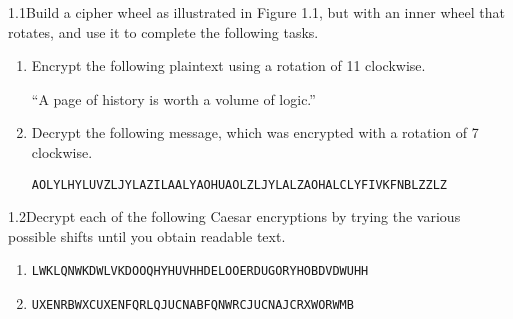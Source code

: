 \begin{exercise}
    {1.1}Build a cipher wheel as illustrated in Figure 1.1, but with an inner wheel that rotates, and use it to complete the following tasks.
    \begin{enumerate}
        \item Encrypt the following plaintext using a rotation of 11 clockwise.
              \begin{center}
                  ``A page of history is worth a volume of logic.''
              \end{center}
        \item Decrypt the following message, which was encrypted with a rotation of 7 clockwise.
              \begin{center}
                  \texttt{AOLYLHYLUVZLJYLAZILAALYAOHUAOLZLJYLALZAOHALCLYFIVKFNBLZZLZ}
              \end{center}
    \end{enumerate}
\end{exercise}


\begin{exercise}
    {1.2}Decrypt each of the following Caesar encryptions by trying the various possible
    shifts until you obtain readable text.
    \begin{enumerate}
        \item \texttt{LWKLQNWKDWLVKDOOQHYHUVHHDELOOERDUGORYHOBDVDWUHH}
        \item \texttt{UXENRBWXCUXENFQRLQJUCNABFQNWRCJUCNAJCRXWORWMB}
    \end{enumerate}
\end{exercise}



